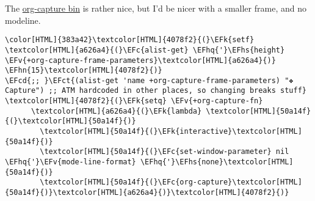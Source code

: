 \documentclass{scrartcl}
\newcommand{\EFk}[1]{\textcolor{EFk}{#1}} %
\newcommand{\EFct}[1]{\textcolor{EFct}{#1}} %
\newcommand{\EFc}[1]{\textcolor{EFc}{#1}} %
\newcommand{\EFv}[1]{\textcolor{EFv}{#1}} %
\newcommand{\EFcd}[1]{\textcolor{EFcd}{#1}} %
\newcommand{\EFhn}[1]{\textcolor{EFhn}{\textbf{#1}}} %
\newcommand{\EFhq}[1]{\textcolor{EFhq}{#1}} %
\newcommand{\EFhs}[1]{\textcolor{EFhs}{#1}} %
\begin{document}
The \href{file:///home/shauryasingh/.emacs.doom/bin/org-capture}{org-capture bin} is rather nice, but I'd be nicer with a smaller frame, and
no modeline.

\begin{Code}
\begin{Verbatim}[]
\color[HTML]{383a42}\textcolor[HTML]{4078f2}{(}\EFk{setf} \textcolor[HTML]{a626a4}{(}\EFc{alist-get} \EFhq{'}\EFhs{height} \EFv{+org-capture-frame-parameters}\textcolor[HTML]{a626a4}{)} \EFhn{15}\textcolor[HTML]{4078f2}{)}
\EFcd{;; }\EFct{(alist-get 'name +org-capture-frame-parameters) "❖ Capture") ;; ATM hardcoded in other places, so changing breaks stuff}
\textcolor[HTML]{4078f2}{(}\EFk{setq} \EFv{+org-capture-fn}
      \textcolor[HTML]{a626a4}{(}\EFk{lambda} \textcolor[HTML]{50a14f}{(}\textcolor[HTML]{50a14f}{)}
        \textcolor[HTML]{50a14f}{(}\EFk{interactive}\textcolor[HTML]{50a14f}{)}
        \textcolor[HTML]{50a14f}{(}\EFc{set-window-parameter} nil \EFhq{'}\EFv{mode-line-format} \EFhq{'}\EFhs{none}\textcolor[HTML]{50a14f}{)}
        \textcolor[HTML]{50a14f}{(}\EFc{org-capture}\textcolor[HTML]{50a14f}{)}\textcolor[HTML]{a626a4}{)}\textcolor[HTML]{4078f2}{)}
\end{Verbatim}
\end{Code}
\end{document}
